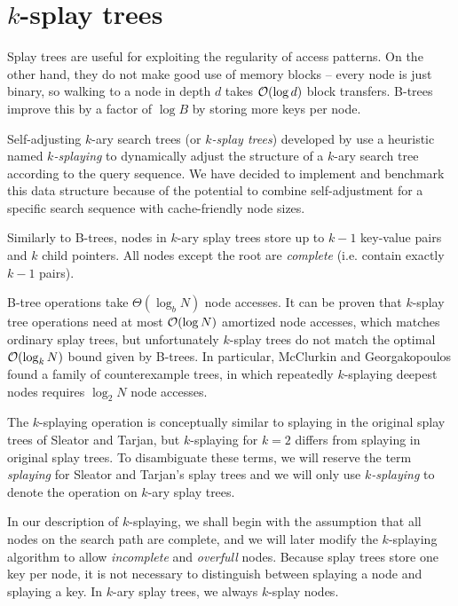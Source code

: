 \chapter{$k$-splay trees}
Splay trees are useful for exploiting the regularity of access patterns.
On the other hand, they do not make good use of memory blocks -- every node
is just binary, so walking to a node in depth $d$ takes $\mathcal{O}(\log d)$ block
transfers. B-trees improve this by a factor of $\log B$ by storing more keys
per node.

Self-adjusting $k$-ary search trees (or \textit{$k$-splay trees}) developed
by \cite{ksplay-sherk} use a heuristic named \textit{$k$-splaying}
to dynamically adjust the structure of a $k$-ary search tree according to
the query sequence. We have decided to implement and benchmark this data
structure because of the potential to combine self-adjustment for a specific
search sequence with cache-friendly node sizes.

Similarly to B-trees, nodes in $k$-ary splay trees store up to $k-1$ key-value
pairs and $k$ child pointers. All nodes except the root are \textit{complete}
(i.e. contain exactly $k-1$ pairs).

B-tree operations take $\Theta(\log_b N)$ node accesses. It can be proven that
$k$-splay tree operations need at most $\mathcal{O}(\log N)$ amortized node accesses,
which matches ordinary splay trees, but unfortunately $k$-splay trees
do not match the optimal $\mathcal{O}(\log_k N)$ bound given by B-trees. In particular,
McClurkin and Georgakopoulos\cite{ksplay-nonopt} found a family
of counterexample trees, in which repeatedly $k$-splaying deepest nodes
requires $\log_2 N$ node accesses.

The $k$-splaying operation is conceptually similar to splaying in the original
splay trees of Sleator and Tarjan, but $k$-splaying for $k=2$ differs from
splaying in original splay trees. To disambiguate these terms, we will
reserve the term \textit{splaying} for Sleator and Tarjan's splay trees and
we will only use \textit{$k$-splaying} to denote the operation
on $k$-ary splay trees.

In our description of $k$-splaying, we shall begin with the assumption that
all nodes on the search path are complete, and we will later modify
the $k$-splaying algorithm to allow \textit{incomplete} and \textit{overfull}
nodes.
Because splay trees store one key per node, it is not necessary to distinguish
between splaying a node and splaying a key. In $k$-ary splay trees, we always
$k$-splay nodes.


